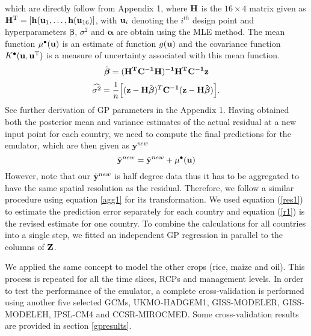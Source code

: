 which are directly follow from Appendix 1, where ${\bf H}$ is the $16\times 4$ matrix given as ${\bf H}^{\rm T} = [{\bf h}({\bf u}_1,\ldots,{\bf h}({\bf u}_{16})]$, with ${\bf u}_i$ denoting the $i^{th}$ design point and hyperparameters $\boldsymbol \beta$, $\sigma^2$ and $\boldsymbol \alpha$ are obtain using the MLE method. The mean function $\mu^{\bullet}({\bf u})$ is an estimate of function $g({\bf u})$ and the covariance function $K^{\bullet}({\bf u},{\bf u}^{\rm T})$ is a measure of uncertainty associated with this mean function. 
\begin{equation}
\hat{\boldsymbol \beta}=(\bf H^TC^{-1}H)^{-1}H^TC^{-1}z
\end{equation}
\begin{equation}
\widehat{\sigma^2}=\frac{1}{n}\Big[(\mathbf{z-H}\hat{\boldsymbol \beta})^T\bf C^{-1}(z-H\hat{\boldsymbol \beta})\Big].
\end{equation}
See further derivation of GP parameters in the Appendix 1. Having obtained both the posterior mean and variance estimates of the actual residual at a new input point for each country, we need to compute the final predictions for the emulator, which are then given as $\mathbf{y}^{new}$
\begin{equation}\label{r1}
{\hat {\bf y}}^{new} = {\tilde {\bf y}}^{new} +\mu^{\bullet}(\bf u)
\end{equation}
However, note that our ${\tilde {\bf y}}^{new}$ is half degree data thus it has to be aggregated to have the same spatial resolution as the residual. Therefore, we follow a similar procedure using equation \ref{agg1} for its transformation.
We used equation (\ref{res1}) to estimate the prediction error separately for each country and equation (\ref{r1}) is the revised estimate for one country. To combine the calculations for all countries into a single step, we fitted an independent GP regression in parallel to the columns of ${\bf Z}$.

We applied the same concept to model the other crops (rice, maize and oil). This process is repeated for all the time slices, RCPs and management levels. In order to test the performance of the emulator, a complete cross-validation is performed using another five selected GCMs, UKMO-HADGEM1, GISS-MODELER, GISS-MODELEH, IPSL-CM4 and CCSR-MIROCMED. Some cross-validation results are provided in section \ref{gpresults}.



